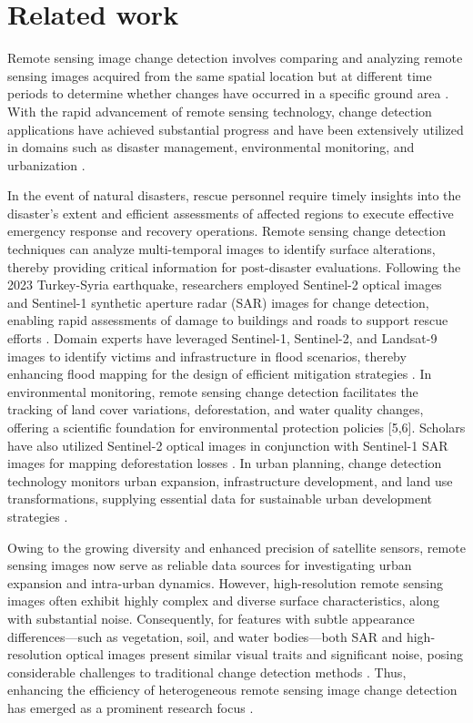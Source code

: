 \documentclass[a4paper,fleqn]{cas-dc}
\begin{document}
\section{Related work}
Remote sensing image change detection involves comparing and analyzing remote sensing images acquired from the same spatial location but at different time periods to determine whether changes have occurred in a specific ground area \cite{B01}. With the rapid advancement of remote sensing technology, change detection applications have achieved substantial progress and have been extensively utilized in domains such as disaster management, environmental monitoring, and urbanization \cite{B02}.

In the event of natural disasters, rescue personnel require timely insights into the disaster's extent and efficient assessments of affected regions to execute effective emergency response and recovery operations. Remote sensing change detection techniques can analyze multi-temporal images to identify surface alterations, thereby providing critical information for post-disaster evaluations. Following the 2023 Turkey-Syria earthquake, researchers employed Sentinel-2 optical images and Sentinel-1 synthetic aperture radar (SAR) images for change detection, enabling rapid assessments of damage to buildings and roads to support rescue efforts \cite{B03}. Domain experts have leveraged Sentinel-1, Sentinel-2, and Landsat-9 images to identify victims and infrastructure in flood scenarios, thereby enhancing flood mapping for the design of efficient mitigation strategies \cite{B04}. In environmental monitoring, remote sensing change detection facilitates the tracking of land cover variations, deforestation, and water quality changes, offering a scientific foundation for environmental protection policies [5,6]. Scholars have also utilized Sentinel-2 optical images in conjunction with Sentinel-1 SAR images for mapping deforestation losses \cite{B07}. In urban planning, change detection technology monitors urban expansion, infrastructure development, and land use transformations, supplying essential data for sustainable urban development strategies \cite{B08}.

Owing to the growing diversity and enhanced precision of satellite sensors, remote sensing images now serve as reliable data sources for investigating urban expansion and intra-urban dynamics. However, high-resolution remote sensing images often exhibit highly complex and diverse surface characteristics, along with substantial noise. Consequently, for features with subtle appearance differences—such as vegetation, soil, and water bodies—both SAR and high-resolution optical images present similar visual traits and significant noise, posing considerable challenges to traditional change detection methods \cite{B09}. Thus, enhancing the efficiency of heterogeneous remote sensing image change detection has emerged as a prominent research focus \cite{B10}.
\end{document}
